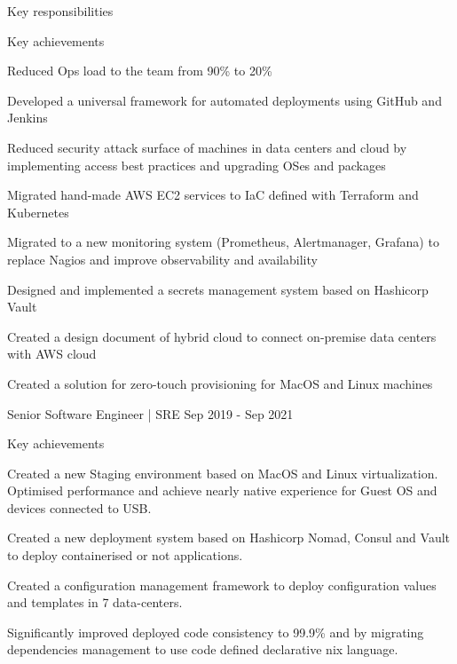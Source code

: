 \begin{cventries}
{\begin{cvitems}{Key responsibilities}
        \end{cvitems}
        \begin{cvitems}{Key achievements}
            \item {Reduced Ops load to the team from 90\% to 20\%}
            \item {Developed a universal framework for automated deployments using GitHub and Jenkins}
            \item {Reduced security attack surface of machines in data centers and cloud by implementing access best practices and upgrading OSes and packages}
            \item {Migrated hand-made AWS EC2 services to IaC defined with Terraform and Kubernetes}
            \item {Migrated to a new monitoring system (Prometheus, Alertmanager, Grafana) to replace Nagios and improve observability and availability}
            \item {Designed and implemented a secrets management system based on Hashicorp Vault}
            \item {Created a design document of hybrid cloud to connect on-premise data centers with AWS cloud}
            \item {Created a solution for zero-touch provisioning for MacOS and Linux machines}
        \end{cvitems}
    }

    \cventry
    {Senior Software Engineer | SRE} %
    {} %
    {} %
    {} %
    {Sep 2019 - Sep 2021} %
    {
      \begin{cvitems}{Key achievements} %
        \item {Created a new Staging environment based on MacOS and Linux virtualization. Optimised performance and achieve nearly native experience for Guest OS and devices connected to USB.}
        \item {Created a new deployment system based on Hashicorp Nomad, Consul and Vault to deploy containerised or not applications.}
        \item {Created a configuration management framework to deploy configuration values and templates in 7 data-centers.}
        \item {Significantly improved deployed code consistency to 99.9\% and by migrating dependencies management to use code defined declarative nix language.}
      \end{cvitems}
    }


\end{cventries}

